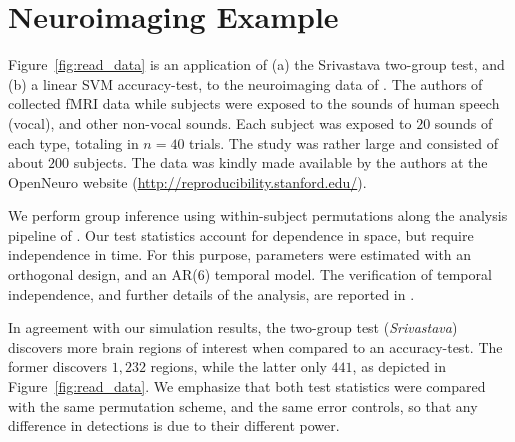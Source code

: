 \documentclass[oupdraft]{bio}
\begin{document}
\section{Neuroimaging Example}
\label{sec:example}

Figure~\ref{fig:read_data} is an application of (a) the Srivastava two-group test, and (b) a linear SVM accuracy-test, to the neuroimaging data of \citet{pernet_human_2015}. 
The authors of \cite{pernet_human_2015} collected fMRI data while subjects were exposed to the sounds of human speech (vocal), and other non-vocal sounds. 
Each subject was exposed to $20$ sounds of each type, totaling in $n=40$ trials.
The study was rather large and consisted of about $200$ subjects.
The data was kindly made available by the authors at the OpenNeuro website (\url{http://reproducibility.stanford.edu/}).

We perform group inference using within-subject permutations along the analysis pipeline of \cite{stelzer_statistical_2013}. 
Our test statistics account for dependence in space, but require independence in time. 
For this purpose, parameters were estimated with an orthogonal design, and an AR(6) temporal model.
The verification of temporal independence, and further details of the analysis, are reported in \cite{gilron_quantifying_2016}. 

In agreement with our simulation results, the two-group test (\emph{Srivastava}) discovers more brain regions of interest when compared to an accuracy-test.
The former discovers $1,232$ regions, while the latter only $441$, as depicted in Figure~\ref{fig:read_data}.
We emphasize that both test statistics were compared with the same permutation scheme, and the same error controls, so that any difference in detections is due to their different power.
\end{document}
